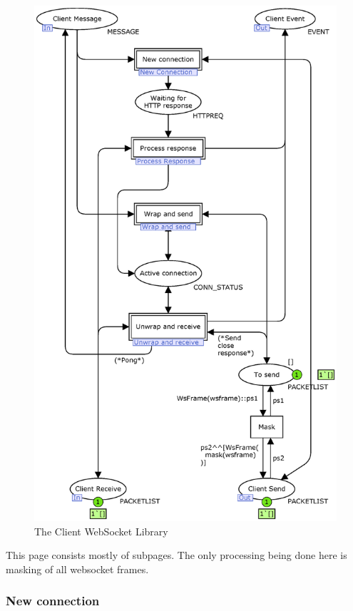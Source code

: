 \begin{figure}
\centering
\includegraphics[scale=0.4]{figures/ClientWebSocket.eps}
\caption{The Client WebSocket Library}
\label{fig:client_wslib}
\end{figure}

This page consists mostly of subpages. The only processing being done here is
masking of all websocket frames.

\subsubsection{New connection}


